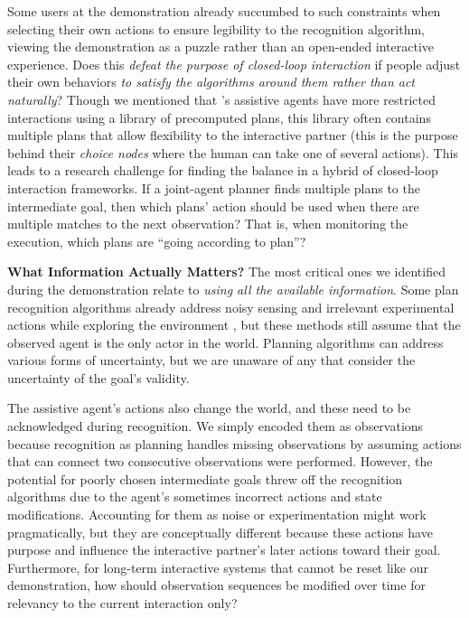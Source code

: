 \documentclass[letterpaper]{article} %
\begin{document}
Some users at the demonstration already succumbed to such constraints when selecting their own actions to ensure legibility to the recognition algorithm, viewing the demonstration as a puzzle rather than an open-ended interactive experience.  Does this \textit{defeat the purpose of closed-loop interaction} if people adjust their own behaviors \textit{to satisfy the algorithms around them rather than act naturally}?  Though we mentioned that \citeauthor{jair_levineWilliams}'s  assistive agents have more restricted interactions using %
a library of precomputed plans, this library often contains multiple plans that allow flexibility to the interactive partner (this is the purpose behind their \textit{choice nodes} where the human can take one of several actions).  This leads to a research challenge for finding the balance in a hybrid of closed-loop interaction frameworks.  If a joint-agent planner finds multiple plans to the intermediate goal, then which plans' action should be used when there are multiple matches to the next observation?  That is, when monitoring the execution, which plans are ``going according to plan''?




\textbf{What Information Actually Matters?} The most critical ones we identified during the demonstration relate to \textit{using all the available information}.  Some plan recognition algorithms already address noisy sensing \cite{DBLP:conf/ijcai/SohrabiRU16} and irrelevant experimental actions while exploring the environment \cite{DBLP:journals/tist/MirskyGS17}, but these methods still assume that the observed agent is the only actor in the world.  Planning algorithms can address various forms of uncertainty, but we are unaware of any that consider the uncertainty of the goal's validity.

The assistive agent's actions also change the world, and these need to be acknowledged during recognition.  We simply encoded them as observations because recognition as planning handles missing observations by assuming actions %
that can connect two consecutive observations %
were performed.  However, the potential for poorly chosen intermediate goals %
threw off the recognition algorithms due to the agent's sometimes incorrect actions and state modifications.  Accounting for them as noise or experimentation might work pragmatically, but they are conceptually different because these actions have purpose and influence the interactive partner's later actions toward their goal.  Furthermore, for long-term interactive systems that cannot be reset like our demonstration, how should observation sequences be modified over time for relevancy to the current interaction only?
\end{document}
